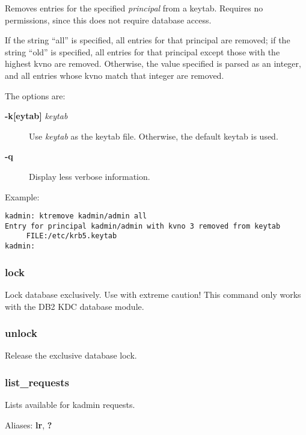 \documentclass[letterpaper,10pt,english]{sphinxmanual}
\begin{document}
Removes entries for the specified \emph{principal} from a keytab.  Requires
no permissions, since this does not require database access.

If the string ``all'' is specified, all entries for that principal are
removed; if the string ``old'' is specified, all entries for that
principal except those with the highest kvno are removed.  Otherwise,
the value specified is parsed as an integer, and all entries whose
kvno match that integer are removed.

The options are:
\begin{description}
\item[{\textbf{-k{[}eytab{]}} \emph{keytab}}] \leavevmode
Use \emph{keytab} as the keytab file.  Otherwise, the default keytab is
used.

\item[{\textbf{-q}}] \leavevmode
Display less verbose information.

\end{description}

Example:

\begin{Verbatim}[commandchars=\\\{\}]
kadmin: ktremove kadmin/admin all
Entry for principal kadmin/admin with kvno 3 removed from keytab
     FILE:/etc/krb5.keytab
kadmin:
\end{Verbatim}


\subsubsection{lock}
\label{admin/admin_commands/kadmin_local:ktremove-end}\label{admin/admin_commands/kadmin_local:lock}
Lock database exclusively.  Use with extreme caution!  This command
only works with the DB2 KDC database module.


\subsubsection{unlock}
\label{admin/admin_commands/kadmin_local:unlock}
Release the exclusive database lock.


\subsubsection{list\_requests}
\label{admin/admin_commands/kadmin_local:list-requests}
Lists available for kadmin requests.

Aliases: \textbf{lr}, \textbf{?}
\end{document}
